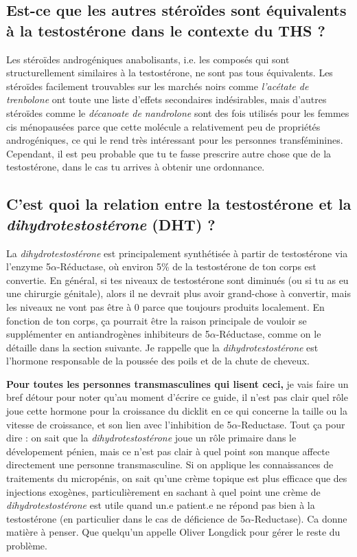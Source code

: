 \documentclass{article}
\begin{document}
\subsection{Est-ce que les autres stéroïdes sont équivalents à la testostérone dans le contexte du THS ?}

Les stéroïdes androgéniques anabolisants, i.e. les composés qui sont structurellement similaires à la testostérone, ne sont pas tous équivalents. Les stéroïdes facilement trouvables sur les marchés noirs comme \textit{l'acétate de trenbolone} ont toute une liste d'effets secondaires indésirables, mais d'autres stéroïdes comme le \textit{décanoate de nandrolone} sont des fois utilisés pour les femmes cis ménopausées parce que cette molécule a relativement peu de propriétés androgéniques, ce qui le rend très intéressant pour les personnes transféminines. Cependant, il est peu probable que tu te fasse prescrire autre chose que de la testostérone, dans le cas tu arrives à obtenir une ordonnance.

\subsection{C'est quoi la relation entre la testostérone et la \textit{dihydrotestostérone} (DHT) ?}

La \textit{dihydrotestostérone} est principalement synthétisée à partir de testostérone via l'enzyme 5$\alpha$-Réductase, où environ 5\% de la testostérone de ton corps est convertie. En général, si tes niveaux de testostérone sont diminués (ou si tu as eu une chirurgie génitale), alors il ne devrait plus avoir grand-chose à convertir, mais les niveaux ne vont pas être à 0 parce que toujours produits localement. En fonction de ton corps, ça pourrait être la raison principale de vouloir se supplémenter en antiandrogènes inhibiteurs de 5$\alpha$-Réductase, comme on le détaille dans la section suivante. Je rappelle que la \textit{dihydrotestostérone} est l'hormone responsable de la poussée des poils et de la chute de cheveux.

\textbf{Pour toutes les personnes transmasculines qui lisent ceci,} je vais faire un bref détour pour noter qu'au moment d'écrire ce guide, il n'est pas clair quel rôle joue cette hormone pour la croissance du dicklit en ce qui concerne la taille ou la vitesse de croissance, et son lien avec l'inhibition de 5$\alpha$-Reductase. Tout ça pour dire : on sait que la \textit{dihydrotestostérone }joue un rôle primaire dans le dévelopement pénien, mais ce n'est pas clair à quel point son manque affecte directement une personne transmasculine. Si on applique les connaissances de traitements du micropénis, on sait qu'une crème topique est plus efficace que des injections exogènes, particulièrement en sachant à quel point une crème de \textit{dihydrotestostérone} est utile quand un.e patient.e ne répond pas bien à la testostérone (en particulier dans le cas de déficience de 5$\alpha$-Reductase). Ca donne matière à penser. Que quelqu'un appelle Oliver Longdick pour gérer le reste du problème. 
\end{document}

